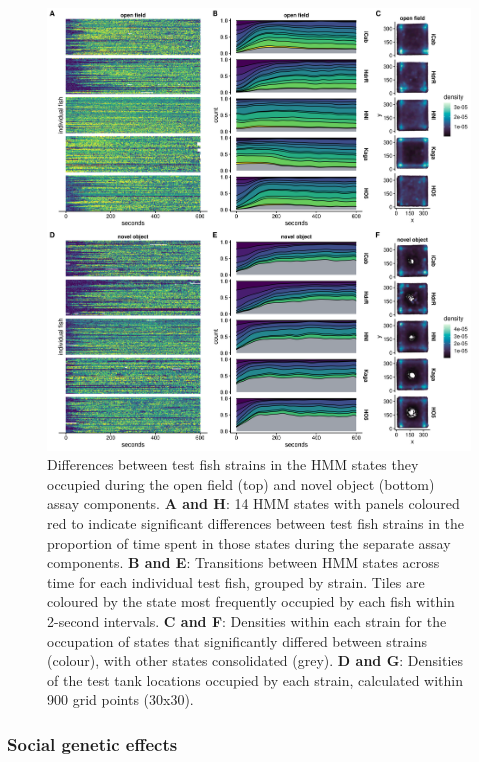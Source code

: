 \documentclass[
]{book}
\begin{document}
\begin{figure}
\includegraphics[width=1\linewidth]{figs/pilot/0.08_14_dge} \caption{Differences between test fish strains in the HMM states they occupied during the open field (top) and novel object (bottom) assay components. \textbf{A and H}: 14 HMM states with panels coloured red to indicate significant differences between test fish strains in the proportion of time spent in those states during the separate assay components. \textbf{B and E}: Transitions between HMM states across time for each individual test fish, grouped by strain. Tiles are coloured by the state most frequently occupied by each fish within 2-second intervals. \textbf{C and F}: Densities within each strain for the occupation of states that significantly differed between strains (colour), with other states consolidated (grey). \textbf{D and G}: Densities of the test tank locations occupied by each strain, calculated within 900 grid points (30x30).}\label{fig:pilot-dge-time}
\end{figure}

\hypertarget{pilot-sge}{%
\subsubsection{Social genetic effects}\label{pilot-sge}}
\end{document}
